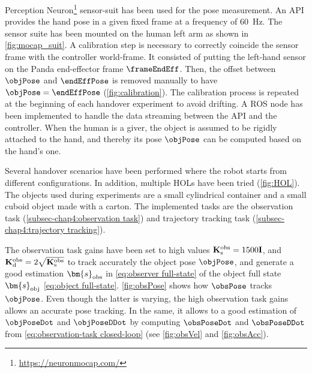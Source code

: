 Perception Neuron\footnote{\url{https://neuronmocap.com/}} sensor-suit has been used for the pose measurement. An API provides the hand pose in a given fixed frame at a frequency of 60~Hz. The sensor suite has been mounted on the human left arm as shown in  \cref{fig:mocap_suit}. A calibration step is necessary to correctly coincide the sensor frame with the controller world-frame. It consisted of putting the left-hand sensor on the Panda end-effector frame $\frameEndEff$. Then, the offset between $\objPose$ and $\endEffPose$ is removed manually to have $\objPose=\endEffPose$ (\cref{fig:calibration}). The calibration process is repeated at the beginning of each handover experiment to avoid drifting.    
A ROS node has been implemented to handle the data streaming between the API and the controller.  
When the human is a giver, the object is assumed to be rigidly attached to the hand, and thereby its pose $\objPose$ can be computed based on the hand's one.


Several handover scenarios have been performed where the robot starts from different configurations. In addition, multiple HOLs have been tried (\cref{fig:HOL}). The objects used during experiments are a small cylindrical container and a small cuboid object made with a carton. The implemented tasks are the observation task (\cref{subsec-chap4:observation task}) and trajectory tracking task (\cref{subsec-chap4:trajectory tracking}).






The observation task gains have been set to high values $\mathbf{K}_{\rm{s}}^{\rm obs} = 1500\mathbf{I}$, and  $ \mathbf{K}_{\rm d}^{\rm obs} = 2\sqrt{\mathbf{K}_{\rm{s}}^{\rm obs}}$ to track accurately the object pose $\objPose$, and generate a good estimation $\bm{s}_{\rm obs}$ in \cref{eq:observer full-state} of the object full state $\bm{s}_{\rm obj}$ \cref{eq:object full-state}.  \cref{fig:obsPose} shows how $\obsPose$ tracks $\objPose$. Even though the latter is varying, the high observation task gains allows an accurate pose tracking. In the same, it allows to a good estimation of $\objPoseDot$ and $\objPoseDDot$ by computing $\obsPoseDot$ and $\obsPoseDDot$ from \cref{eq:observation-task closed-loop} (see \cref{fig:obsVel} and \cref{fig:obsAcc}). 




